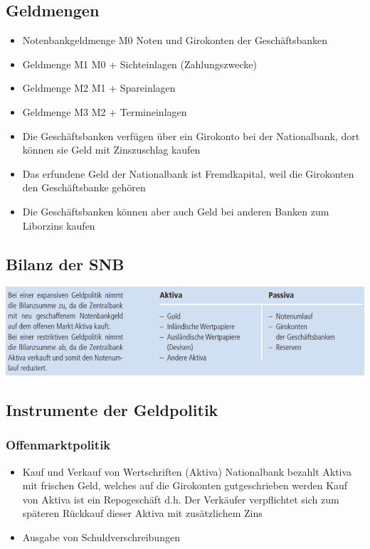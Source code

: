 \subsection{Geldmengen}
\begin{itemize}
	\item Notenbankgeldmenge M0
	\subitem Noten und Girokonten der Geschäftsbanken
	\item Geldmenge M1
	\subitem M0 + Sichteinlagen (Zahlungszwecke)
	\item Geldmenge M2
	\subitem M1 + Spareinlagen
	\item Geldmenge M3
	\subitem M2 + Termineinlagen
	\item Die Geschäftsbanken verfügen über ein Girokonto bei der Nationalbank, dort können sie Geld mit Zinszuschlag kaufen
	\item Das erfundene Geld der Nationalbank ist Fremdkapital, weil die Girokonten den Geschäftsbanke gehören
	\item Die Geschäftsbanken können aber auch Geld bei anderen Banken zum Liborzins kaufen
\end{itemize}
\subsection{Bilanz der SNB}
\includegraphics[width=18cm]{images/snb.jpg}
\subsection{Instrumente der Geldpolitik}
\subsubsection{Offenmarktpolitik}
\begin{itemize}
	\item Kauf und Verkauf von Wertschriften (Aktiva)
	\subitem Nationalbank bezahlt Aktiva mit frischen Geld, welches auf die Girokonten gutgeschrieben werden
	\subitem Kauf von Aktiva ist ein Repogeschäft d.h. Der Verkäufer verpflichtet sich zum späteren Rückkauf dieser Aktiva mit zusätzlichem Zins
	\item Ausgabe von Schuldverschreibungen 
\end{itemize}
